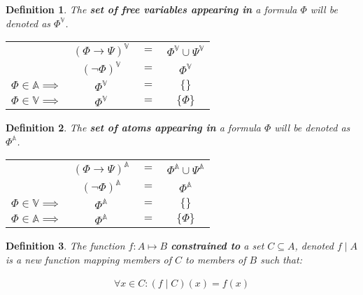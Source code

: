 \documentclass{article}
\newtheorem{defin}{Definition}
\begin{document}
\begin{defin}
The \textbf{set of free variables appearing in} a formula $\Phi$ will be denoted as $\Phi^\mathbb{V}$.
\setlength{\tabcolsep}{1pt}
\begin{center}
	\begin{tabular}{rclc}
		                               & $(\Phi \rightarrow \Psi)^\mathbb{V}$ & $=$ & $ \Phi^\mathbb{V} \cup \Psi^\mathbb{V}$ \\
		                               & $(\neg \Phi)^\mathbb{V}            $ & $=$ & $ \Phi^\mathbb{V}               $ \\
		$\Phi \in \mathbb{A} \implies$ & $\Phi^\mathbb{V}                   $ & $=$ & $ \{\}                    $ \\
		$\Phi \in \mathbb{V} \implies$ & $\Phi^\mathbb{V}                   $ & $=$ & $ \{\Phi\}                $
	\end{tabular}
\end{center}
\end{defin}

\begin{defin}
The \textbf{set of atoms appearing in} a formula $\Phi$ will be denoted as $\Phi^\mathbb{A}$.
\setlength{\tabcolsep}{1pt}
\begin{center}
	\begin{tabular}{rclc}
		                               & $(\Phi \rightarrow \Psi)^\mathbb{A}$ & $=$ & $ \Phi^\mathbb{A} \cup \Psi^\mathbb{A}$ \\
		                               & $(\neg \Phi)^\mathbb{A}            $ & $=$ & $ \Phi^\mathbb{A}               $ \\
		$\Phi \in \mathbb{V} \implies$ & $\Phi^\mathbb{A}                   $ & $=$ & $ \{\}                    $ \\
		$\Phi \in \mathbb{A} \implies$ & $\Phi^\mathbb{A}                   $ & $=$ & $ \{\Phi\}                $
	\end{tabular}
\end{center}
\end{defin}
\begin{defin}
The function $f : A \mapsto B$ \textbf{constrained to} a set $C \subseteq A$, denoted $f \mid A$ is a new function mapping
members of $C$ to members of $B$ such that:

\begin{align*}
\forall x \in C : (f \mid C) (x) = f (x)
\end{align*}
\end{defin}
\end{document}
